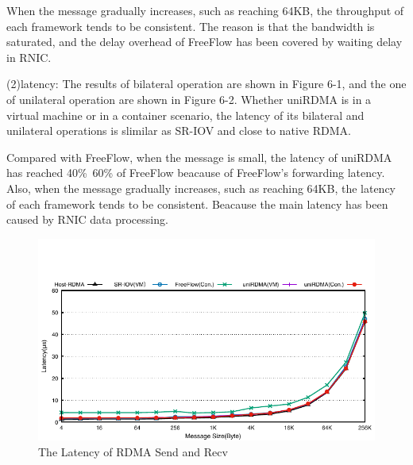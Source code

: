 When the message gradually increases, such as reaching 64KB, the throughput of each framework tends to be consistent. The reason is that the bandwidth is saturated, and the delay overhead of FreeFlow has been covered by waiting delay in RNIC.

(2)latency: The results of bilateral operation are shown in Figure 6-1, and the one of unilateral operation are shown in Figure 6-2. Whether uniRDMA is in a virtual machine or in a container scenario, the latency of its bilateral and unilateral operations is slimilar as SR-IOV and close to native RDMA.

Compared with FreeFlow, when the message is small, the latency of uniRDMA has reached 40\%~60\%  of FreeFlow beacause of FreeFlow's forwarding latency. Also, when the message gradually increases, such as reaching 64KB, the latency of each framework tends to be consistent. Beacause the main latency has been caused by RNIC data processing.

\begin{figure}[!ht]
	\centering
	\includegraphics[width=1.0\linewidth]{images/send-lat}
	\caption{The Latency of RDMA Send and Recv}
	\label{fig:send-lat}
\end{figure}

